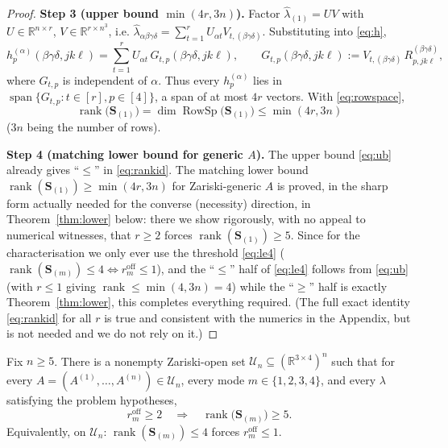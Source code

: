 \begin{proof}
\medskip\noindent\textbf{Step 3 (upper bound $\min(4r,3n)$).}
Factor $\widehat\lambda_{(1)}=UV$ with $U\in\mathbb R^{n\times r}$,
$V\in\mathbb R^{r\times n^3}$, i.e. $\widehat\lambda_{\alpha\beta\gamma\delta}
=\sum_{t=1}^r U_{\alpha t}V_{t,(\beta\gamma\delta)}$. Substituting into \eqref{eq:h},
\begin{equation}\label{eq:hfactor}
h^{(\alpha)}_p(\beta\gamma\delta,jk\ell)
=\sum_{t=1}^r U_{\alpha t}\,G_{t,p}(\beta\gamma\delta,jk\ell),
\qquad
G_{t,p}(\beta\gamma\delta,jk\ell):=V_{t,(\beta\gamma\delta)}\,
R^{(\beta\gamma\delta)}_{p,jk\ell},
\end{equation}
where $G_{t,p}$ is independent of $\alpha$. Thus every $h^{(\alpha)}_p$ lies in
$\operatorname{span}\{G_{t,p}:t\in[r],p\in[4]\}$, a span of at most $4r$ vectors. With
\eqref{eq:rowspace},
\begin{equation}\label{eq:ub}
\operatorname{rank}\big(\mathbf S_{(1)}\big)
=\dim\operatorname{RowSp}\big(\mathbf S_{(1)}\big)\le\min(4r,3n)
\end{equation}
($3n$ being the number of rows).

\medskip\noindent\textbf{Step 4 (matching lower bound for generic $A$).}
The upper bound \eqref{eq:ub} already gives ``$\le$'' in \eqref{eq:rankid}. The matching
lower bound $\operatorname{rank}(\mathbf S_{(1)})\ge\min(4r,3n)$ for Zariski-generic $A$ is
proved, in the sharp form actually needed for the converse (necessity) direction, in
Theorem~\ref{thm:lower} below: there we show rigorously, with no appeal to numerical
witnesses, that $r\ge2$ forces $\operatorname{rank}(\mathbf S_{(1)})\ge5$. Since for the
characterisation we only ever use the threshold \eqref{eq:le4}
($\operatorname{rank}(\mathbf S_{(m)})\le4\iff r_m^{\mathrm{off}}\le1$), and the ``$\le$''
half of \eqref{eq:le4} follows from \eqref{eq:ub} (with $r\le1$ giving
$\operatorname{rank}\le\min(4,3n)=4$) while the ``$\ge$'' half is exactly
Theorem~\ref{thm:lower}, this completes everything required. (The full exact identity
\eqref{eq:rankid} for all $r$ is true and consistent with the numerics in the Appendix, but
is not needed and we do not rely on it.)
\end{proof}

\begin{theorem}\label{thm:lower}
Fix $n\ge5$. There is a nonempty Zariski-open set
$\mathcal U_n\subseteq(\mathbb R^{3\times4})^n$ such that for every
$A=(A^{(1)},\dots,A^{(n)})\in\mathcal U_n$, every mode $m\in\{1,2,3,4\}$, and every
$\lambda$ satisfying the problem hypotheses,
\[
r_m^{\mathrm{off}}\ge2\quad\Longrightarrow\quad\operatorname{rank}\big(\mathbf S_{(m)}\big)\ge5 .
\]
Equivalently, on $\mathcal U_n$: $\operatorname{rank}(\mathbf S_{(m)})\le4$ forces
$r_m^{\mathrm{off}}\le1$.
\end{theorem}

